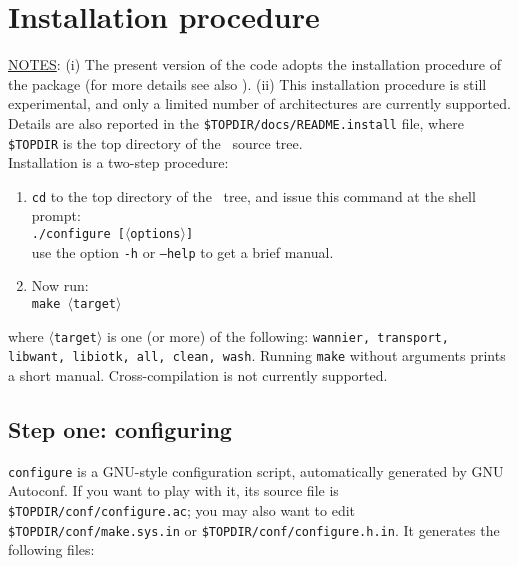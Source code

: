 
\thispagestyle{empty}
\section{Installation procedure}\label{section:install}

\noindent \underline {NOTES}: (i) The present version of the code
adopts the installation procedure of the \PWSCF package (for more details see
also \PWSCFURL). (ii) This installation procedure is still
experimental, and only a limited number of architectures are
currently supported.
Details are also reported in the {\tt \$TOPDIR/docs/README.install} file,
where {\tt \$TOPDIR} is the top directory of the \WANT\ source tree. \\

\noindent Installation is a two-step procedure:
%
%
\begin{enumerate}
\item \texttt{cd} to the top directory of the \WANT\ tree,
and issue this command at the shell
prompt:\\
{\tt ./configure [$\langle$options$\rangle$] } \\
use the option {\tt -h} or {\tt --help} to get a brief manual.
\item Now run:\\
     {\tt make $\langle$target$\rangle$ }
\end{enumerate}
%
%
where {\tt $\langle$target$\rangle$} is one (or more) of the following:
{\tt wannier, transport, libwant, libiotk, all, clean, wash}. Running
{\tt make} without arguments prints a short manual.
Cross-compilation is not currently supported.


\subsection{Step one: configuring} {\tt configure} is a GNU-style configuration script,
automatically generated by GNU Autoconf. If you want to play
with it, its source file is {\tt \$TOPDIR/conf/configure.ac}; you may also
want to edit {\tt \$TOPDIR/conf/make.sys.in} or {\tt \$TOPDIR/conf/configure.h.in}. 
It generates the following files: \\

